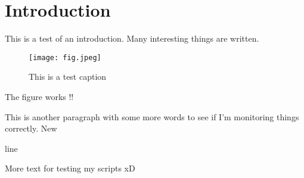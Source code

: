 \chapter{Introduction}
\label{ch:intro}

This is a test of an introduction. Many interesting things are written.

\begin{figure}[h]
	\centering
	\texttt{[image: fig.jpeg]}
	\caption{This is a test caption}
	\label{fig:testfig}
\end{figure}

The figure works !! \cite{feynman2018space}

This is another paragraph with some more words to see if I'm monitoring things correctly. New

line

More text for testing my scripts xD

